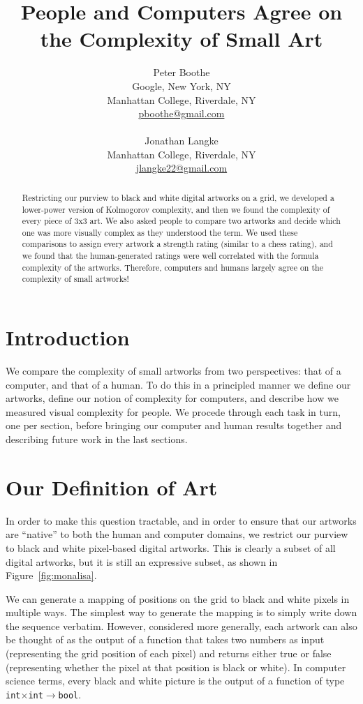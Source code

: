 \documentclass[11pt]{article}
\title{\textbf{People and Computers Agree on the Complexity of Small Art}}
\author{
	Peter Boothe \\
	Google, New York, NY \\
	Manhattan College, Riverdale, NY \\
	\url{pboothe@gmail.com} \\
	\\
	Jonathan Langke \\
	Manhattan College, Riverdale, NY \\
	\url{jlangke22@gmail.com}
}
\date{}
\begin{document}
\maketitle

\thispagestyle{empty}

\begin{abstract}

Restricting our purview to black and white digital artworks on a grid, we
developed a lower-power version of Kolmogorov complexity, and then we found the
complexity of every piece of 3x3 art.  We also asked people to compare two
artworks and decide which one was more visually complex as they understood the
term.  We used these comparisons to assign every artwork a strength rating
(similar to a chess rating), and we found that the human-generated ratings were
well correlated with the formula complexity of the artworks.  Therefore,
computers and humans largely agree on the complexity of small artworks!

\end{abstract}

\section*{Introduction}

We compare the complexity of small artworks from two perspectives: that of a
computer, and that of a human.  To do this in a principled manner we define our
artworks, define our notion of complexity for computers, and describe how we
measured visual complexity for people.  We procede through each task in turn,
one per section, before bringing our computer and human results
together and describing future work in the last sections.

\section*{Our Definition of Art}

In order to make this question tractable, and in order to ensure that our
artworks are ``native'' to both the human and computer domains, we restrict our
purview to black and white pixel-based digital artworks.  This is clearly a
subset of all digital artworks, but it is still an expressive subset, as shown
in Figure~\ref{fig:monalisa}.  

We can generate a mapping of positions on the grid to black and white pixels in
multiple ways.  The simplest way to generate the mapping is to simply write
down the sequence verbatim.  However, considered more generally, each artwork
can also be thought of as the output of a function that takes two numbers as
input (representing the grid position of each pixel) and returns either true or
false (representing whether the pixel at that position is black or white).  In
computer science terms, every black and white picture is the output of a
function of type {\tt int$\times$int$\to$bool}.  
\end{document}
